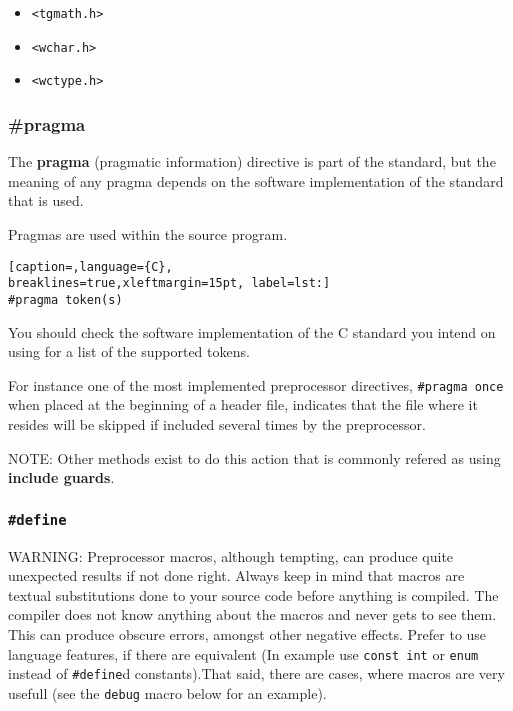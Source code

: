 \begin{itemize}
\setlength{\itemsep}{0cm}
\setlength{\parskip}{0cm}
	\item \texttt{\textless{}tgmath.h\textgreater{}}
	\item \texttt{\textless{}wchar.h\textgreater{}}
	\item \texttt{\textless{}wctype.h\textgreater{}}
\end{itemize}

\subsubsection{\#pragma}
The \textbf{pragma} (pragmatic information) directive is part of the standard,
but the meaning of any pragma depends on the software implementation of the
standard that is used.

Pragmas are used within the source program.
\lstset{basicstyle=\scriptsize, numbers=left, captionpos=b, tabsize=4}
\begin{lstlisting}[caption=,language={C},
breaklines=true,xleftmargin=15pt, label=lst:]
#pragma token(s)
\end{lstlisting}

You should check the software implementation of the C standard you intend on
using for a list of the supported tokens. 

For instance one of the most implemented preprocessor directives,
\texttt{\#pragma once} when placed at the beginning of a header file, indicates
that the file where it resides will be skipped if included several times by the
preprocessor.

NOTE: Other methods exist to do this action that is commonly refered as using
\textbf{include guards}.

\subsubsection{\texttt{\#define}}
WARNING: Preprocessor macros, although tempting, can produce quite unexpected
results if not done right. Always keep in mind that macros are textual
substitutions done to your source code before anything is compiled. The
compiler does not know anything about the macros and never gets to see them.
This can produce obscure errors, amongst other negative effects. Prefer to use
language features, if there are equivalent (In example use \texttt{const int}
or \texttt{enum} instead of \texttt{\#define}d constants).That said, there are
cases, where macros are very usefull (see the \texttt{debug} macro below for an
example).

